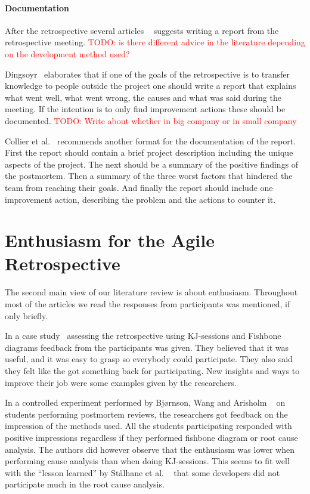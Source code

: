 \documentclass[12pt]{article}
\newcommand\todo[1]{\textcolor{red}{#1}}
\begin{document}
\paragraph{Documentation}
After the retrospective several articles ~\cite{Dingsoyr2005, Moe2001, Hanssen2003, Collier1996} suggests writing a report from the retrospective meeting. \todo{TODO: is there different advice in the literature depending on the development method used?}

Dingsoyr~\cite{Dingsoyr2005} elaborates that if one of the goals of the retrospective is to transfer knowledge to people outside the project one should write a report that explains what went well, what went wrong, the causes and what was said during the meeting. If the intention is to only find improvement actions these should be documented. \todo{TODO: Write about whether in big company or in small company}

Collier et al.~\cite{Collier1996} recommends another format for the documentation of the report. First the report should contain a brief project description including the unique aspects of the project. The next should be a summary of the positive findings of the postmortem. Then a summary of the three worst factors that hindered the team from reaching their goals. And finally the report should include one improvement action, describing the problem and the actions to counter it. 

\section{Enthusiasm for the Agile Retrospective}
The second main view of our literature review is about enthusiasm. Throughout most of the articles we read the responses from participants was mentioned, if only briefly. 

In a case study~\cite{Hanssen2003} assessing the retrospective using KJ-sessions and Fishbone diagrams feedback from the participants was given. They believed that it was useful, and it was easy to grasp so everybody could participate. They also said they felt like the got something back for participating. New insights and ways to improve their job were some examples given by the researchers. 

In a controlled experiment performed by Bjørnson, Wang and Arisholm ~\cite{Bjornson2009} on students performing postmortem reviews, the researchers got feedback on the impression of the methods used. All the students participating responded with positive impressions regardless if they performed fishbone diagram or root cause analysis. The authors did however observe that the enthusiasm was lower when performing cause analysis than when doing KJ-sessions. This seems to fit well with the ``lesson learned'' by Stålhane et al. ~\cite{Hanssen2003}  that some developers did not participate much in the root cause analysis. 
\end{document}

